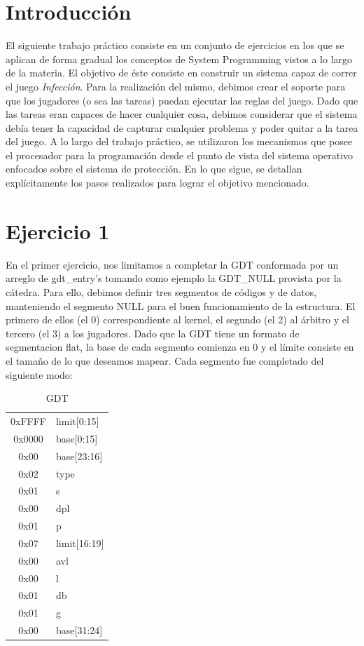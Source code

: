 \documentclass[10pt, a4paper]{article}
\begin{document}
\section{Introducci\'on}
El siguiente trabajo práctico consiste en un conjunto de ejercicios en los que se aplican de forma gradual los conceptos de System Programming vistos a lo largo de la materia. El objetivo de éste consiste en construir un sistema capaz de correr el juego \textit{Infección}. Para la realización del mismo, debimos crear el soporte para que los jugadores (o sea las tareas) puedan ejecutar las reglas del juego. Dado que las tareas eran capaces de hacer cualquier cosa, debimos considerar que el sistema debía tener la capacidad de capturar cualquier problema y poder quitar a la tarea del juego.\newline
A lo largo del trabajo práctico, se utilizaron los mecanismos que posee el procesador para la programación desde el punto de vista del sistema operativo enfocados sobre el sistema de protección. En lo que sigue, se detallan explícitamente los pasos realizados para lograr el objetivo mencionado.

\section{Ejercicio 1}
En el primer ejercicio, nos limitamos a completar la GDT conformada por un arreglo de gdt\_entry's tomando como ejemplo la GDT\_NULL provista por la cátedra. Para ello, debimos definir tres segmentos de códigos y de datos, manteniendo el segmento NULL para el buen funcionamiento de la estructura. El primero de ellos (el 0) correspondiente al kernel, el segundo (el 2) al árbitro y el tercero (el 3) a los jugadores. Dado que la GDT tiene un formato de segmentacion flat, la base de cada segmento comienza en 0 y el límite consiste en el tamaño de lo que deseamos mapear. Cada segmento fue completado del siguiente modo:

\begin{table}[H]
\centering
    \begin{tabular}{|c|l|}
        \hline
        0xFFFF & limit[0:15] \\ 
        0x0000 & base[0:15] \\
        0x00 & base[23:16] \\ 
        0x02 & type \\ 
        0x01 & s \\ 
        0x00 & dpl \\ 
        0x01 & p \\ 
        0x07 & limit[16:19] \\ 
        0x00 & avl \\ 
        0x00 & l \\ 
        0x01 & db \\ 
        0x01 & g \\ 
        0x00 & base[31:24] \\ 
        \hline
    \end{tabular}
    \caption{GDT}
\end{table}
\end{document}
